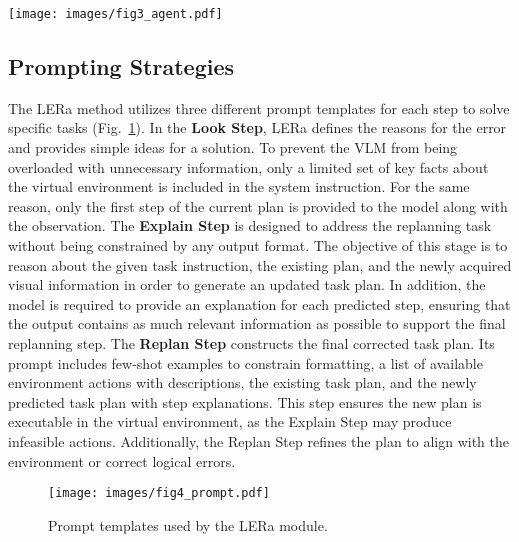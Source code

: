\documentclass[letterpaper, 10 pt, conference]{ieeeconf}  %
\begin{document}
\begin{figure*}[t]
  \centering
  \texttt{[image: images/fig3\_agent.pdf]}
  \caption{The proposed structure of an agent to use LERa consists of three modules: (1) Task Planner, (2) Subtask Executor, and (3) Subtask Checker. \textcolor{blue}{Blue} is for language, \textcolor{yellow}{yellow} is for planning and execution, \textcolor{red}{red} is for self-checking, and \textcolor{green}{green} is for replanning.}
  \label{fig:method_overview}
  \vspace{-10pt}
\end{figure*}

\subsection{Prompting Strategies}
\label{subsec:prompting}
The LERa method utilizes three different prompt templates for each step to solve specific tasks (Fig.~\ref{fig:prompt_templates}). In the \textbf{Look Step}, LERa defines the reasons for the error and provides simple ideas for a solution. To prevent the VLM from being overloaded with unnecessary information, only a limited set of key facts about the virtual environment is included in the system instruction. For the same reason, only the first step of the current plan is provided to the model along with the observation. The \textbf{Explain Step} is designed to address the replanning task without being constrained by any output format. The objective of this stage is to reason about the given task instruction, the existing plan, and the newly acquired visual information in order to generate an updated task plan. In addition, the model is required to provide an explanation for each predicted step, ensuring that the output contains as much relevant information as possible to support the final replanning step. The \textbf{Replan Step} constructs the final corrected task plan. Its prompt includes few-shot examples to constrain formatting, a list of available environment actions with descriptions, the existing task plan, and the newly predicted task plan with step explanations. This step ensures the new plan is executable in the virtual environment, as the Explain Step may produce infeasible actions. Additionally, the Replan Step refines the plan to align with the environment or correct logical errors.


\begin{figure}[h]
    \centering
    \texttt{[image: images/fig4\_prompt.pdf]} %
    \caption{Prompt templates used by the LERa module.}
    \label{fig:prompt_templates}
\end{figure}
\end{document}
